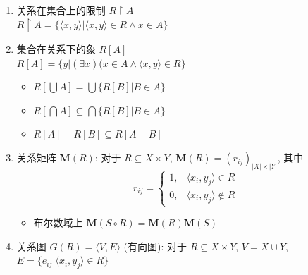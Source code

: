 \documentclass[11pt,a4paper,twocolumn,fleqn]{article} %
\begin{document}
\begin{enumerate}
\begin{itemize}
	\end{itemize}
	\item 关系在集合上的限制 $R\upharpoonright A$ \\
	$R \upharpoonright A = \{ \langle x, y \rangle | \langle x, y \rangle \in R
	\land x \in A\}$
	\item 集合在关系下的象 $R[A]$ \\
	$R[A] = \{y|(\exists x)(x\in A \land \langle x, y \rangle \in R\}$
	\begin{itemize}
		\item $R[\bigcup A] = \bigcup\{R[B]|B\in A\}$
		\item $R[\bigcap A] \subseteq \bigcap\{R[B]|B\in A\}$
		\item $R[A] - R[B] \subseteq R[A-B]$
	\end{itemize}
	\item 关系矩阵 $\bm{M}(R)$: 对于 $R\subseteq X\times Y$, 
	$\bm{M}(R) = (r_{ij})_{|X|\times|Y|}$, 其中
	$$
	r_{ij} = \begin{cases}
		1, & \langle x_i, y_j \rangle \in R \\
		0, & \langle x_i, y_j \rangle \notin R
	\end{cases}
	$$
	\begin{itemize}
		\item 布尔数域上 $\bm M(S\circ R) = \bm M (R) \bm M(S)$
	\end{itemize}
	\item 关系图 $G(R) = \langle V, E \rangle$ (有向图): 
	对于 $R\subseteq X\times Y$, 
	$V = X\cup Y$, $E = \{e_{ij}|\langle x_i, y_j\rangle\in R\}$
\end{enumerate}
\end{document}
